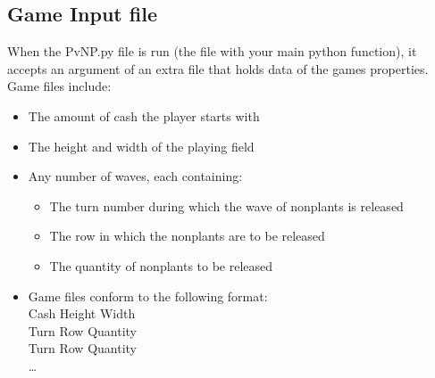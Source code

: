 \documentclass{42-en}
\begin{document}
    \subsection {Game Input file}
    When the PvNP.py file is run (the file with your main python function), it accepts an argument of an extra file that holds data of the games properties.
    \\
    Game files include:
                \begin{itemize}
                \item The amount of cash the player starts with
                \item The height and width of the playing field
                \item Any number of waves, each containing:
                \begin{itemize}
                    \item The turn number during which the wave of nonplants is released
                    \item The row in which the nonplants are to be released
                    \item The quantity of nonplants to be released
                \end{itemize}
                \item Game files conform to the following format:
                \\
                Cash Height Width\\
                Turn Row Quantity\\
                Turn Row Quantity\\
                \dots
                \end{itemize}
    \newpage
\end{document}
